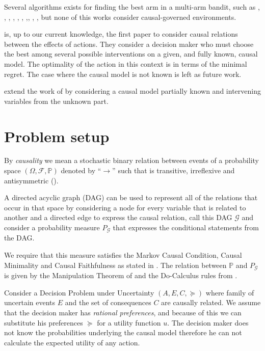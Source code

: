 \documentclass{article}
\begin{document}
Several algorithms exists for finding the best arm in a multi-arm bandit, such as \cite{bubeck2009pure}, \cite{gabillon2012best}, \cite{agarwal2014taming} \cite{audibert2010best}, \cite{jamieson2014lil},  \cite{jamieson2014best},  \cite{ortega2014generalized}, \cite{chen2015optimal},\cite{carpentier2016tight},  \cite{russo2016simple},  \cite{kaufmann2016complexity}, but none of this works consider causal-governed environments.

\cite{lattimoreNIPS2016} is, up to our current knowledge, the first paper to consider causal relations between the effects of actions. They consider a decision maker who must choose the best among several possible interventions on a given, and fully known, causal model. The optimality of the action in this context is in terms of the minimal regret. The case where the causal model is not known is left as future work.

\cite{sen2017identifying} extend the work of \cite{lattimoreNIPS2016} by considering a causal model partially known and intervening variables from the unknown part.



\section{Problem setup}
By \textit{causality} we mean a stochastic binary relation between events of a probability space $(\Omega, \mathcal{F}, \mathbb{P})$ denoted by $“\to”$ such that is transitive, irreflexive and antisymmetric (\cite{spirtes2000causation}). 

A directed acyclic graph (DAG) can be used to represent all of the relations that occur in that space by considering a node for every variable that is related to another and a directed edge to express the causal relation, call this DAG $\mathcal{G}$ and consider a probability measure $P_{\mathcal{G}}$ that expresses the conditional statements from the DAG. 

We require that this measure satisfies the Markov Causal Condition, Causal Minimality and Causal Faithfulness as stated in \cite{spirtes2000causation}. The relation between $\mathbb{P}$ and $P_{\mathcal{G}}$ is given by the Manipulation Theorem of \cite{spirtes2000causation} and the Do-Calculus rules from \cite{pearl2009causality}.

Consider a Decision Problem under Uncertainty $(A,E,C,\succeq)$ where family of uncertain events $E$ and the set of consequences $C$ are causally related. We assume that the decision maker has \textit{rational preferences}, and because of this we can substitute his preferences $\succeq$ for a utility function $u$. The decision maker does not know the probabilities underlying the causal model therefore he can not calculate the expected utility of any action. 
\end{document}

